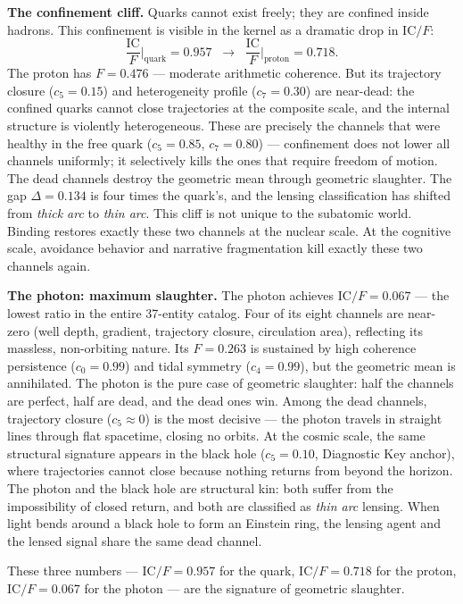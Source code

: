 \documentclass[
  aps,
  prd,
  twocolumn,
  superscriptaddress,
  nofootinbib,
  floatfix
]{revtex4-2}
\newcommand{\beq}{\begin{equation}}
\newcommand{\eeq}{\end{equation}}
\newcommand{\IC}{\mathrm{IC}}
\begin{document}
\textbf{The confinement cliff.}
Quarks cannot exist freely; they are confined inside hadrons.
This confinement is visible in the kernel as a dramatic drop
in $\IC/F$:
\beq\label{eq:confinement}
  \frac{\IC}{F}\bigg|_{\text{quark}} = 0.957
  \;\;\longrightarrow\;\;
  \frac{\IC}{F}\bigg|_{\text{proton}} = 0.718.
\eeq
The proton has $F = 0.476$ --- moderate arithmetic coherence.
But its trajectory closure ($c_5 = 0.15$) and heterogeneity
profile ($c_7 = 0.30$) are near-dead: the confined quarks
cannot close trajectories at the composite scale, and the
internal structure is violently heterogeneous.  These are
precisely the channels that were healthy in the free quark
($c_5 = 0.85$, $c_7 = 0.80$) --- confinement does not lower
all channels uniformly; it selectively kills the ones that
require freedom of motion.  The dead channels destroy the
geometric mean through geometric slaughter.  The gap
$\Delta = 0.134$ is four times the quark's, and the
lensing classification has shifted from \emph{thick arc}
to \emph{thin arc}.
This cliff is not unique to the subatomic world.  Binding
restores exactly these two channels at the nuclear scale.
At the cognitive scale, avoidance behavior and narrative
fragmentation kill exactly these two channels again.

\textbf{The photon: maximum slaughter.}
The photon achieves $\IC/F = 0.067$ --- the lowest ratio in
the entire 37-entity catalog.  Four of its eight channels are
near-zero (well depth, gradient, trajectory closure,
circulation area), reflecting its massless, non-orbiting
nature.  Its $F = 0.263$ is sustained by high coherence
persistence ($c_0 = 0.99$) and tidal symmetry ($c_4 = 0.99$),
but the geometric mean is annihilated.  The photon is the
pure case of geometric slaughter: half the channels are
perfect, half are dead, and the dead ones win.
Among the dead channels, trajectory closure ($c_5 \approx 0$)
is the most decisive --- the photon travels in straight lines
through flat spacetime, closing no orbits.  At the cosmic
scale, the same structural signature appears in the
black hole ($c_5 = 0.10$, Diagnostic Key anchor), where
trajectories cannot close because nothing returns from beyond
the horizon.  The photon and the black hole are structural
kin: both suffer from the impossibility of closed return, and
both are classified as \emph{thin arc}
lensing.  When light bends around a black hole to form
an Einstein ring, the lensing agent and the lensed signal
share the same dead channel.

These three numbers --- $\IC/F = 0.957$ for the quark,
$\IC/F = 0.718$ for the proton, $\IC/F = 0.067$ for
the photon --- are the signature of geometric slaughter.
\end{document}
